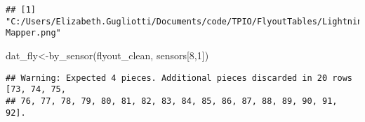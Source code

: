 \documentclass[
]{article}
\newenvironment{Shaded}{\begin{snugshade}}{\end{snugshade}}
\newcommand{\DecValTok}[1]{\textcolor[rgb]{0.00,0.00,0.81}{#1}}
\newcommand{\FunctionTok}[1]{\textcolor[rgb]{0.00,0.00,0.00}{#1}}
\newcommand{\NormalTok}[1]{#1}
\newcommand{\OtherTok}[1]{\textcolor[rgb]{0.56,0.35,0.01}{#1}}
\begin{document}
\begin{verbatim}
## [1] "C:/Users/Elizabeth.Gugliotti/Documents/code/TPIO/FlyoutTables/Lightning Mapper.png"
\end{verbatim}

\begin{Shaded}
\begin{Highlighting}[]
\NormalTok{dat\_fly}\OtherTok{\textless{}{-}}\FunctionTok{by\_sensor}\NormalTok{(flyout\_clean, sensors[}\DecValTok{8}\NormalTok{,}\DecValTok{1}\NormalTok{])}
\end{Highlighting}
\end{Shaded}

\begin{verbatim}
## Warning: Expected 4 pieces. Additional pieces discarded in 20 rows [73, 74, 75,
## 76, 77, 78, 79, 80, 81, 82, 83, 84, 85, 86, 87, 88, 89, 90, 91, 92].
\end{verbatim}
\end{document}
